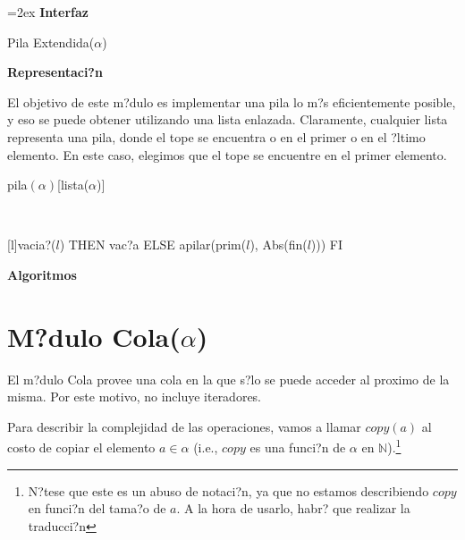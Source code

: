 \documentclass[a4paper,10pt]{article}
\newenvironment{Interfaz}{%
  \parskip=2ex%
  \noindent\textbf{\Large Interfaz}%
  \par%
}{}
\newenvironment{Representacion}{%
  \vspace*{2ex}%
  \noindent\textbf{\Large Representaci?n}%
  \vspace*{2ex}%
}{}
\newenvironment{Algoritmos}{%
  \vspace*{2ex}%
  \noindent\textbf{\Large Algoritmos}%
  \vspace*{2ex}%
}{}
\begin{document}
\begin{Interfaz}
  \begin{tad}{Pila Extendida($\alpha$)}
    \parskip=0pt
    
    \tadAxiomas
  \end{tad}

\end{Interfaz}

\begin{Representacion}
  
  El objetivo de este m?dulo es implementar una pila lo m?s eficientemente posible, y eso se puede obtener utilizando una lista enlazada.  Claramente, cualquier lista representa una pila, donde el tope se encuentra o en el primer o en el ?ltimo elemento.  En este caso, elegimos que el tope se encuentre en el primer elemento.

  \begin{Estructura}{pila$(\alpha)$}[lista($\alpha$)]
  \end{Estructura}


  ~

  [l]{\IF vacia?($l$) THEN vac?a ELSE apilar(prim($l$), Abs(fin($l$))) FI}

\end{Representacion}

\begin{Algoritmos}
  
\end{Algoritmos}


\section{M?dulo Cola($\alpha$)}

El m?dulo Cola provee una cola en la que s?lo se puede acceder al proximo de la misma.  Por este motivo, no incluye iteradores.

Para describir la complejidad de las operaciones, vamos a llamar $copy(a)$ al costo de copiar el elemento $a \in \alpha$ (i.e., $copy$ es una funci?n de $\alpha$ en $\mathbb{N}$).\footnote{N?tese que este es un abuso de notaci?n, ya que no estamos describiendo $copy$ en funci?n del tama?o de $a$.  A la hora de usarlo, habr? que realizar la traducci?n}
\end{document}
